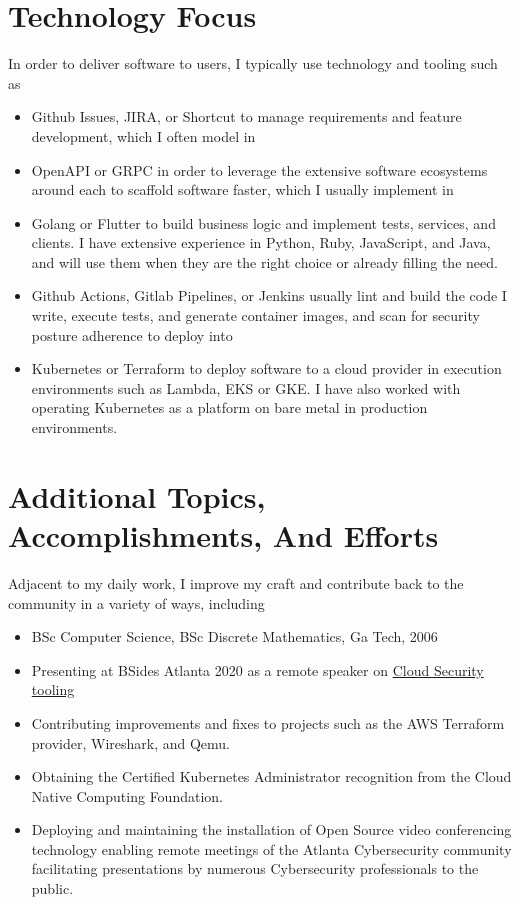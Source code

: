 \documentclass[letterpaper,10pt]{article}
\begin{document}
\section{Technology Focus}
In order to deliver software to users, I typically use technology and tooling such as
\begin{itemize}
	\setlength\itemsep{0.1em}
	\item Github Issues, JIRA, or Shortcut to manage requirements and feature development, which I often model in
	\item OpenAPI or GRPC in order to leverage the extensive software ecosystems around each to scaffold software faster, which I usually implement in
	\item Golang or Flutter to build business logic and implement tests, services, and clients. I have extensive experience in Python, Ruby, JavaScript, and Java, and will use them when they are the right choice or already filling the need.
	\item Github Actions, Gitlab Pipelines, or Jenkins usually lint and build the code I write, execute tests, and generate container images, and scan for security posture adherence to deploy into
	\item Kubernetes or Terraform to deploy software to a cloud provider in execution environments such as Lambda, EKS or GKE. I have also worked with operating Kubernetes as a platform on bare metal in production environments.
\end{itemize}

\section{Additional Topics, Accomplishments, And Efforts}
Adjacent to my daily work, I improve my craft and contribute back to the community in a variety of ways, including
\begin{itemize}
	\setlength\itemsep{0.1em}
	\item BSc Computer Science, BSc Discrete Mathematics, Ga Tech, 2006
	\item Presenting at BSides Atlanta 2020 as a remote speaker on \href{https://www.youtube.com/watch?v=kLCaAaUd1mM}{\color{blue}Cloud Security tooling}
	\item Contributing improvements and fixes to projects such as the AWS Terraform provider, Wireshark, and Qemu.
	\item Obtaining the Certified Kubernetes Administrator recognition from the Cloud Native Computing Foundation.
	\item Deploying and maintaining the installation of Open Source video conferencing technology enabling remote meetings of the Atlanta Cybersecurity community facilitating presentations by numerous Cybersecurity professionals to the public.
\end{itemize}
\end{document}
